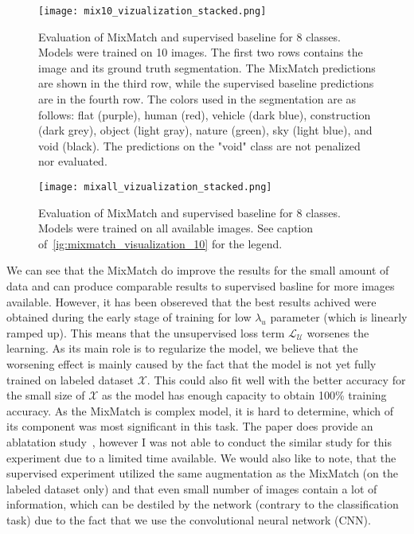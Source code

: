 \begin{figure}[t]
    \centering
    \texttt{[image: mix10\_vizualization\_stacked.png]}
    \caption[Mixmatch result visualization (10)]{Evaluation of MixMatch and supervised baseline for 8 classes. Models were trained on 10 images. 
    The first two rows contains the image and its ground truth segmentation. The MixMatch predictions are shown in the third row, 
    while the supervised baseline predictions are in the fourth row. \newline
     The colors used in the segmentation are as follows: flat (purple), human (red), vehicle (dark blue), construction (dark grey), 
     object (light gray), nature (green), sky (light blue), and void (black). The predictions on the "void"
    class are not penalized nor evaluated.}
    \label{fig:mixmatch_visualization_10}
\end{figure}

\begin{figure}[t]
    \centering
    \texttt{[image: mixall\_vizualization\_stacked.png]}
    \caption[Mixmatch result visualization (10)]{Evaluation of MixMatch and supervised baseline for 8 classes. Models were trained on all available images.
    See caption of~\ref{ig:mixmatch_visualization_10} for the legend.}
    \label{fig:mixmatch_visualization_all}
\end{figure}

We can see that the MixMatch do improve the results for the small amount of data and can produce comparable results to supervised basline 
for more images available. However, it has been obsereved that the best results achived were obtained during the early stage of training for low $\lambda_u$
parameter (which is linearly ramped up). This means that the unsupervised loss term $\mathcal{L}_{\mathcal{U}}$ worsenes the learning. 
As its main role is to regularize the model, we believe that the worsening effect is mainly caused by the fact that the model is not yet fully 
trained on labeled dataset $\mathcal{X}$. This could also fit well with the better accuracy for the small size of $\mathcal{X}$ as the model 
has enough capacity to obtain 100\% training accuracy. As the MixMatch is complex model, it is hard to determine, which of its
component was most significant in this task. The paper does provide an ablatation study~\cite{mixmatch-2019}, however I was not able to 
conduct the similar study for this experiment due to a limited time available. We would also like to note, that the supervised experiment utilized the same augmentation as 
the MixMatch (on the labeled dataset only) and that even small number of images contain a lot of information, which can be destiled by the network
(contrary to the classification task) due to the fact that we use the convolutional neural network (CNN). 

